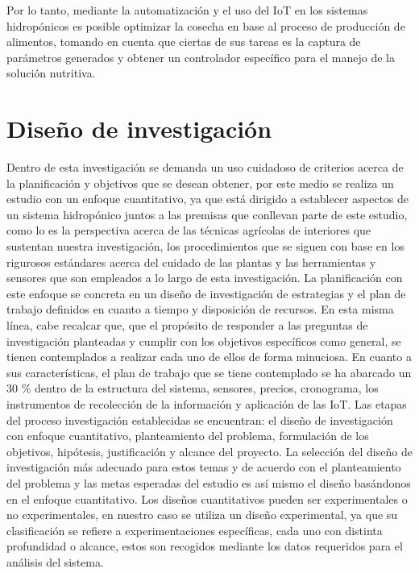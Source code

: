 Por lo tanto, mediante la automatización y el uso del IoT en los sistemas hidropónicos es posible optimizar la cosecha en base al proceso de producción de alimentos, tomando en cuenta que ciertas de sus tareas es la captura de parámetros generados y obtener un controlador específico para el manejo de la solución nutritiva.

\section{Diseño de investigación}
Dentro de esta investigación se demanda un uso cuidadoso de criterios acerca de la planificación y objetivos que se desean obtener, por este medio se realiza un estudio con un enfoque cuantitativo, ya que está dirigido a establecer aspectos de un sistema hidropónico juntos a las premisas que conllevan parte de este estudio, como lo es la perspectiva acerca de las técnicas agrícolas de interiores que sustentan nuestra investigación, los procedimientos que se siguen con base en los rigurosos estándares acerca del cuidado de las plantas y las herramientas y sensores que son empleados a lo largo de esta investigación. La planificación con este enfoque se concreta en un diseño de investigación de estrategias y el plan de trabajo definidos en cuanto a tiempo y disposición de recursos. En esta misma línea, cabe recalcar que, que el propósito de responder a las preguntas de investigación planteadas y cumplir con los objetivos específicos como general, se tienen contemplados a realizar cada uno de ellos de forma minuciosa. En cuanto a sus características, el plan de trabajo que se tiene contemplado se ha abarcado un 30 \% dentro de la estructura del sistema, sensores, precios, cronograma, los instrumentos de recolección de la información y aplicación de las IoT. Las etapas del proceso investigación establecidas se encuentran: el diseño de investigación con enfoque cuantitativo, planteamiento del problema, formulación de los objetivos, hipótesis, justificación y alcance del proyecto. La selección del diseño de investigación más adecuado para estos temas y de acuerdo con el planteamiento del problema y las metas esperadas del estudio es así mismo el diseño basándonos en el enfoque cuantitativo. Los diseños cuantitativos pueden ser experimentales o no experimentales, en nuestro caso se utiliza un diseño experimental, ya que su clasificación se refiere a experimentaciones específicas, cada uno con distinta profundidad o alcance, estos son recogidos mediante los datos requeridos para el análisis del sistema.

